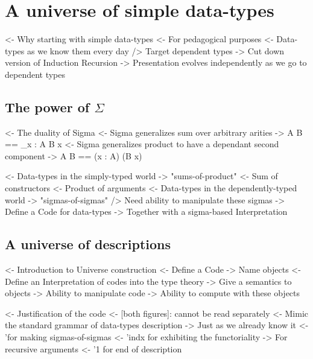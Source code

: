 \documentclass{article}
\newenvironment{structure}{\footnotesize\verbatim}{\endverbatim}
\begin{document}
\section{A universe of simple data-types}

\begin{structure}
<- Why starting with simple data-types
    <- For pedagogical purposes
        <- Data-types as we know them every day
        /> Target dependent types
    -> Cut down version of Induction Recursion
        -> Presentation evolves independently as we go to dependent types
\end{structure}

\subsection{The power of $\Sigma$}

\begin{structure}
<- The duality of Sigma
    <- Sigma generalizes sum over arbitrary arities
        -> \Sigma A B == \Sigma_{x : A} B x
    <- Sigma generalizes product to have a dependant second component
        -> \Sigma A B == (x : A) \times (B x)
\end{structure}

\begin{structure}
<- Data-types in the simply-typed world
    -> "sums-of-product"
        <- Sum of constructors
        <- Product of arguments
<- Data-types in the dependently-typed world
    -> "sigmas-of-sigmas"
    /> Need ability to manipulate these sigmas
        -> Define a Code for data-types
        -> Together with a sigma-based Interpretation
\end{structure}

\subsection{A universe of descriptions}

\begin{structure}
<- Introduction to Universe construction
    <- Define a Code
        -> Name objects
    <- Define an Interpretation of codes into the type theory
        -> Give a semantics to objects
    -> Ability to manipulate code
    -> Ability to compute with these objects
\end{structure}

\begin{structure}
<- Justification of the code 
    <- [both figures]: cannot be read separately
    <- Mimic the standard grammar of data-types description
        -> Just as we already know it
        <- '\Sigma for making sigmas-of-sigmas
        <- 'indx for exhibiting the functoriality
            -> For recursive arguments
        <- '1 for end of description
\end{structure}
\end{document}
